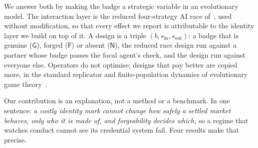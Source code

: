 \documentclass[11pt,a4paper]{article}
\theoremstyle{definition}
\begin{document}
We answer both by making the badge a strategic variable in an evolutionary
model. The interaction layer is the reduced four-strategy AI race
of~\citet{domingos2026falling}, used without modification, so that every effect
we report is attributable to the identity layer we build on top of it. A design
is a triple $(b, s_{\mathrm{in}}, s_{\mathrm{out}})$: a badge that is genuine
($\mathsf{G}$), forged ($\mathsf{F}$) or absent ($\mathsf{N}$), the reduced
race design run against a partner whose badge passes the focal agent's check,
and the design run against everyone else. Operators do not optimise; designs
that pay better are copied more, in the standard replicator and
finite-population dynamics of evolutionary game
theory~\citep{taylor1978ess,hofbauer1998evolutionary,traulsen2006stochastic}.

Our contribution is an explanation, not a method or a benchmark. In one
sentence: \emph{a costly identity mark cannot change how safely a settled
market behaves, only who it is made of, and forgeability decides which,} so a
regime that watches conduct cannot see its credential system fail. Four results
make that precise.
\end{document}
